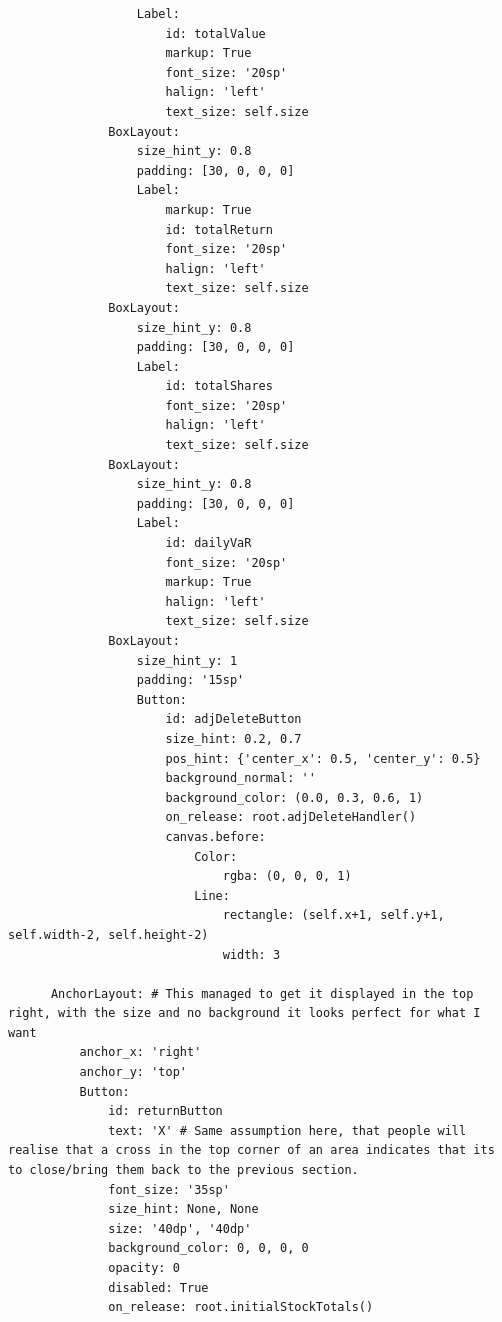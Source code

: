 \documentclass{article}
\begin{document}
\begin{verbatim}
                  Label:
                      id: totalValue
                      markup: True
                      font_size: '20sp'
                      halign: 'left'
                      text_size: self.size
              BoxLayout:
                  size_hint_y: 0.8
                  padding: [30, 0, 0, 0]  
                  Label:
                      markup: True
                      id: totalReturn
                      font_size: '20sp'
                      halign: 'left'
                      text_size: self.size
              BoxLayout:
                  size_hint_y: 0.8
                  padding: [30, 0, 0, 0]  
                  Label:
                      id: totalShares
                      font_size: '20sp'
                      halign: 'left'
                      text_size: self.size
              BoxLayout:
                  size_hint_y: 0.8
                  padding: [30, 0, 0, 0]  
                  Label:
                      id: dailyVaR
                      font_size: '20sp'
                      markup: True
                      halign: 'left'
                      text_size: self.size
              BoxLayout:
                  size_hint_y: 1
                  padding: '15sp'
                  Button:
                      id: adjDeleteButton
                      size_hint: 0.2, 0.7
                      pos_hint: {'center_x': 0.5, 'center_y': 0.5}
                      background_normal: ''
                      background_color: (0.0, 0.3, 0.6, 1)
                      on_release: root.adjDeleteHandler()
                      canvas.before:
                          Color:
                              rgba: (0, 0, 0, 1)
                          Line:
                              rectangle: (self.x+1, self.y+1, self.width-2, self.height-2)
                              width: 3

      AnchorLayout: # This managed to get it displayed in the top right, with the size and no background it looks perfect for what I want
          anchor_x: 'right'
          anchor_y: 'top'
          Button:
              id: returnButton
              text: 'X' # Same assumption here, that people will realise that a cross in the top corner of an area indicates that its to close/bring them back to the previous section.
              font_size: '35sp'
              size_hint: None, None
              size: '40dp', '40dp'
              background_color: 0, 0, 0, 0
              opacity: 0
              disabled: True
              on_release: root.initialStockTotals()






\end{verbatim}
\end{document}

